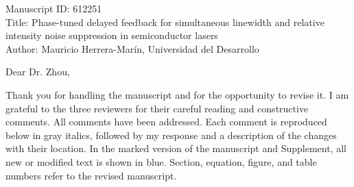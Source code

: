\documentclass[11pt]{article}
\begin{document}
\noindent Manuscript ID: 612251\\
Title: Phase-tuned delayed feedback for simultaneous linewidth and relative intensity noise suppression in semiconductor lasers\\
Author: Mauricio Herrera-Mar\'in, Universidad del Desarrollo

\bigskip
\noindent Dear Dr. Zhou,

\noindent Thank you for handling the manuscript and for the opportunity to revise it. I am grateful to the three reviewers for their careful reading and constructive comments. All comments have been addressed. Each comment is reproduced below in gray italics, followed by my response and a description of the changes with their location. In the marked version of the manuscript and Supplement, all new or modified text is shown in blue. Section, equation, figure, and table numbers refer to the revised manuscript.
\end{document}
